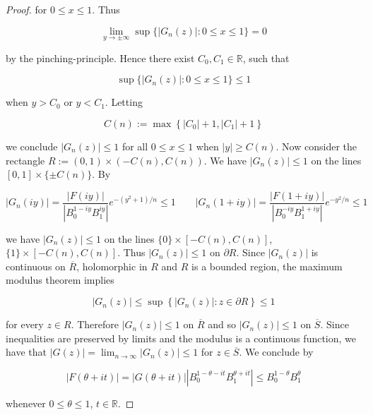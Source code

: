 \begin{proof}
for $0 \leqslant x \leqslant 1$. Thus
	
\begin{equation*}
	\lim_{y \to \pm \infty}\sup\{\left| G_n(z)\right| : 0 \leqslant x \leqslant 1\} = 0
\end{equation*}

by the pinching-principle. Hence there exist $C_0,C_1 \in \mathbb{R}$, such that 

\begin{equation*}
	\sup\{\left| G_n(z)\right| : 0 \leqslant x \leqslant 1\} \leqslant 1
\end{equation*}

when $y > C_0$ or $y < C_1$. Letting

\begin{equation*}
	C(n) := \max\left\{ \left| C_0\right| + 1, \left| C_1 \right| + 1\right\}
\end{equation*}

we conclude $\left| G_n(z) \right| \leqslant 1$ for all $0 \leqslant x \leqslant 1$ when $\left| y \right| \geqslant C(n)$. Now consider the rectangle $R := \left(0,1\right) \times \left(-C(n),C(n)\right)$. We have $\left| G_n(z) \right| \leqslant 1$ on the lines $[0,1] \times \{\pm C(n)\}$. By

\begin{equation*}
	\left| G_n(iy)\right| = \frac{\left| F(iy)\right|}{\left| B_0^{1 - iy} B_1^{iy}\right|}e^{-\left( y^2 + 1 \right)/n} \leqslant 1 \qquad \left| G_n(1 + iy)\right| =	\frac{\left| F(1 + iy)\right|}{\left| B_0^{-iy}B_1^{1 + iy}\right|}e^{-y^2/n} \leqslant 1
\end{equation*}

we have $\left| G_n(z)\right| \leqslant 1$ on the lines $\{0\} \times [-C(n),C(n)]$, $\{1\} \times [-C(n),C(n)]$. Thus $\left| G_n(z) \right| \leqslant 1$ on $\partial R$. Since $\left| G_n(z)\right|$ is continuous on $\overline{R}$, holomorphic in $R$ and $R$ is a bounded region, the maximum modulus theorem implies

\begin{equation*}
	\left| G_n(z)\right| \leqslant \sup\left\{ \left|G_n(z) \right| : z \in \partial R \right\} \leqslant 1
\end{equation*}

for every $z \in R$. Therefore $\left| G_n(z) \right| \leqslant 1$ on $\overline{R}$ and so $\left| G_n(z) \right| \leqslant 1$ on $\overline{S}$. Since inequalities are preserved by limits and the modulus is a continuous function, we have that $\left| G(z) \right| = \lim_{n \to \infty} \left| G_n(z) \right| \leqslant 1$ for $z \in \overline{S}$. We conclude by 

\begin{equation*}
	\left| F(\theta + it) \right| = \left| G(\theta + it) \right| \left| B_0^{1 - \theta - it}B_1^{\theta + it}\right| \leqslant B_0^{1 - \theta} B_1^{\theta}
\end{equation*}

whenever $0 \leqslant \theta \leqslant 1$, $t \in \mathbb{R}$.
\end{proof}

